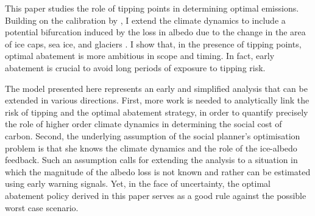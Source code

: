 \documentclass[11pt]{article}
\begin{document}
This paper studies the role of tipping points in determining optimal emissions. Building on the calibration by \cite{hambel_optimal_2021}, I extend the climate dynamics to include a potential bifurcation induced by the loss in albedo due to the change in the area of ice caps, sea ice, and glaciers \cite{ashwin_tipping_2012,ashwin_extreme_2020}. I show that, in the presence of tipping points, optimal abatement is more ambitious in scope and timing. In fact, early abatement is crucial to avoid long periods of exposure to tipping risk.

The model presented here represents an early and simplified analysis that can be extended in various directions. First, more work is needed to analytically link the risk of tipping and the optimal abatement strategy, in order to quantify precisely the role of higher order climate dynamics in determining the social cost of carbon. Second, the underlying assumption of the social planner's optimisation problem is that she knows the climate dynamics and the role of the ice-albedo feedback. Such an assumption calls for extending the analysis to a situation in which the magnitude of the albedo loss is not known and rather can be estimated using early warning signals. Yet, in the face of uncertainty, the optimal abatement policy derived in this paper serves as a good rule against the possible worst case scenario.

\newpage


\newpage\appendix

\end{document}
